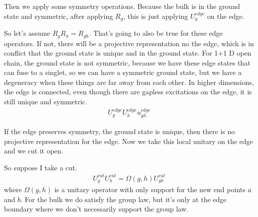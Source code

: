 Then we apply some symmetry operations.
Because the bulk is in the ground state and symmetric,
after applying $R_g$,
this is just applying $U_g^{edge}$ on the edge.


So let's assume $R_g R_h = R_{gh}$.
That's going to also be true for these edge operators.
If not,
there will be a projective representation no the edge,
which is in conflict that the ground state is unique and in the ground state.
For 1+1 D open chain,
the ground state is not symmetric,
because we have these edge states that can fuse to a singlet,
so we can have a symmetric ground state,
but we have a degeneracy when these things are far away from each other.
In higher dimensions,
the edge is connected,
even though there are gapless excitations on the edge,
it is still unique and symmetric.
\begin{align}
    U_g^{edge} U_h^{edge} u_{gh}^{edge}
\end{align}

If the edge preserves symmetry,
the ground state is unique,
then there is no projective representation for the edge.
Now we take this local unitary on the edge and we cut it open.

So suppose I take a cut.
\begin{align}
    U_g^{cut} U_h^{cut} = \Omega(g, h) U_{gh}^{cut}
\end{align}
where $\Omega(g, h)$
is a unitary operator with only support for the new end points $a$ and $b$.
For the bulk we do satisfy the group law,
but it's only at the edge boundary where we don't necessarily support the group
law.



